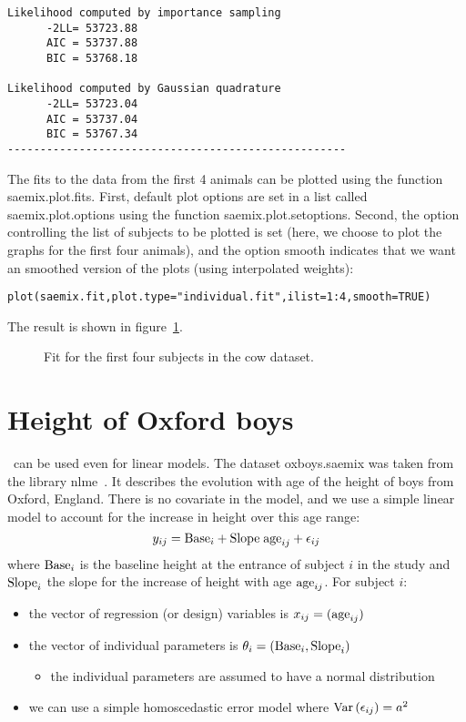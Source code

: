 {\begin{verbatim}
Likelihood computed by importance sampling
      -2LL= 53723.88 
      AIC = 53737.88 
      BIC = 53768.18 

Likelihood computed by Gaussian quadrature
      -2LL= 53723.04 
      AIC = 53737.04 
      BIC = 53767.34 
----------------------------------------------------
\end{verbatim}

\bigskip
The fits to the data from the first 4 animals can be plotted using the function {\sf saemix.plot.fits}. First, default plot options are set in a list called {\sf saemix.plot.options} using the function  {\sf saemix.plot.setoptions}. Second, the option controlling the list of subjects to be plotted is set (here, we choose to plot the graphs for the first four animals), and the option {\sf smooth} indicates that we want an smoothed version of the plots (using interpolated weights):
\begin{verbatim}
plot(saemix.fit,plot.type="individual.fit",ilist=1:4,smooth=TRUE)
\end{verbatim}
The result is shown in figure~\ref{fig:cow.individual}.
\newpage
\begin{figure}[!h]
\begin{center}
\end{center}
\par \kern -0.5cm
\caption{Fit for the first four subjects in the {\sf cow} dataset.} \label{fig:cow.individual}
\end{figure}

\section{Height of Oxford boys} \label{sec:exampleoxboys}

\monolix~can be used even for linear models. The dataset {\sf oxboys.saemix} was taken from the library {\sf nlme}~\cite{nlme}. It describes the evolution with age of the height of boys from Oxford, England. There is no covariate in the model, and we use a simple linear model to account for the increase in height over this age range:
\begin{equation}
y_{ij} = {\rm Base}_i + {\rm Slope} \; {\rm age}_{ij} + \epsilon_{ij}
\end{equation}
where ${\rm Base}_i$ is the baseline height at the entrance of subject $i$ in the study and ${\rm Slope}_i$ the slope for the increase of height with age ${\rm age}_{ij}$. For subject $i$:
\begin{itemize}
\item the vector of regression (or design) variables is $x_{ij} = ({\rm age}_{ij} )$
\item the vector of individual parameters is $\theta_i = \left( {\rm Base}_i, {\rm Slope}_i \right)$
   \begin{itemize}
   \item the individual parameters are assumed to have a normal distribution
   \end{itemize}
\item we can use a simple homoscedastic error model where $\mbox{Var}\left(\epsilon_{ij}\right)=a^2$
\end{itemize}

}
